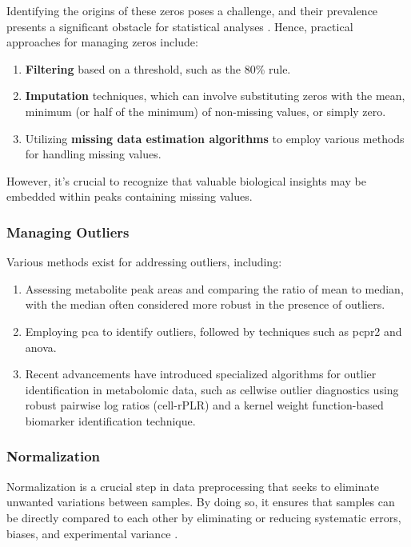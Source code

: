 \documentclass[ENG, BIB]{TFUOC}%
\begin{document}
Identifying the origins of these zeros poses a challenge, and their prevalence presents a significant obstacle for statistical analyses \cite{sunPretreatingNormalizingMetabolomics2024,martin-fernandezDealingZeros2011}. Hence, practical approaches for managing zeros include:
\begin{enumerate}
    \item \textbf{Filtering} based on a threshold, such as the 80\% rule.
    \item \textbf{Imputation} techniques, which can involve substituting zeros with the mean, minimum (or half of the minimum) of non-missing values, or simply zero.
    \item Utilizing \textbf{missing data estimation algorithms} to employ various methods for handling missing values.
\end{enumerate}

However, it's crucial to recognize that valuable biological insights may be embedded within peaks containing missing values.

\subsubsection{Managing Outliers}
Various methods exist for addressing outliers, including:

\begin{enumerate}
    \item Assessing metabolite peak areas and comparing the ratio of mean to median, with the median often considered more robust in the presence of outliers.
    \item Employing \gls{pca} to identify outliers, followed by techniques such as \gls{pcpr2} and \gls{anova}.
    \item Recent advancements have introduced specialized algorithms for outlier identification in metabolomic data, such as cellwise outlier diagnostics using robust pairwise log ratios (cell-rPLR) and a kernel weight function-based biomarker identification technique.
\end{enumerate}


\subsubsection{Normalization}
Normalization is a crucial step in data preprocessing that seeks to eliminate unwanted variations between samples. By doing so, it ensures that samples can be directly compared to each other by eliminating or reducing systematic errors, biases, and experimental variance \cite{zachariasStatisticalAnalysisNMR2018}.
\end{document}

